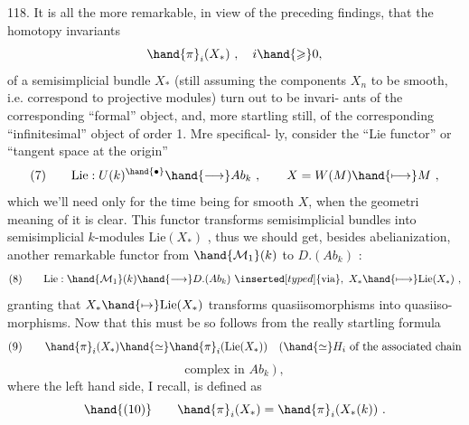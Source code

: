 118. It is all the more remarkable, in view of the preceding findings,
that the homotopy invariants
\[ \hand{\pi}_i(X_*) \ , \quad i \hand{\geqslant} 0 , \]
of a  semisimplicial  bundle $X_*$ (still assuming the components $X_n$ to be
smooth, i.e.  correspond to projective modules) turn out to be invari-%
ants of the corresponding ``formal'' object, and, more startling still,
of the corresponding ``infinitesimal'' object of order 1. Mre specifical-%
ly, consider the ``Lie functor'' or ``tangent space at the origin''
\[ (7) \qquad \mathrm{Lie}: U(k)^{\hand{\bullet}} \hand{\longrightarrow} Ab_k \ , \qquad X = W(M) \hand{\longmapsto} M \ , \]
which we'll need only for the time being for smooth $X$, when the geometri
meaning of it is clear. This functor transforms semisimplicial  bundles
into semisimplicial $k$-modules $\mathrm{Lie}(X_*)$ , thus we should get, besides
abelianization, another remarkable functor\hand{,} from $\hand{\mathcal{M}_1}(k)$  to $D.(Ab_k)$ :
\[ (8) \qquad \mathrm{Lie}: \hand{\mathcal{M}_1}(k) \hand{\longrightarrow} D.(Ab_k) \ \inserted[typed]{\text{via}}, \ X_* \hand{\longmapsto} \mathrm{Lie}(X_*) \ , \]
granting that $X_* \hand{\mapsto} \mathrm{Lie}(X_*)$ transforms quasiisomorphisms into quasiiso-%
morphisms. Now that this must be so follows from the really startling
formula
\[ (9) \qquad \hand{\pi}_i(X_*) \hand{\simeq} \hand{\pi}_i(\mathrm{Lie}(X_*)) \quad (\hand{\simeq} H_i \text{ of the associated chain} \]
\[ \text{complex in } Ab_k \ ) \ , \]
where the left hand side, I recall, is defined as
\[ \hand{(10)} \qquad \hand{\pi}_i(X_*) = \hand{\pi}_i(X_*(k)) \ . \]


